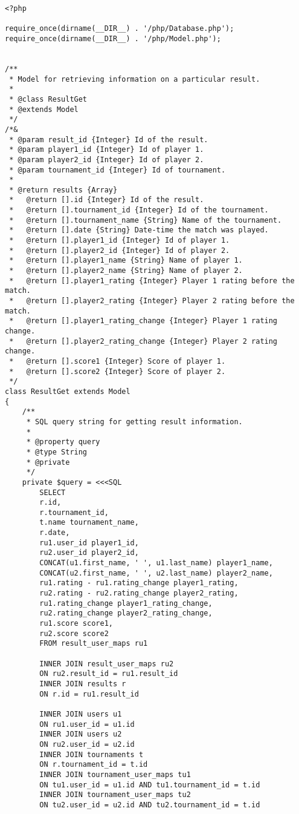 {\scriptsize
\begin{lstlisting}
<?php

require_once(dirname(__DIR__) . '/php/Database.php');
require_once(dirname(__DIR__) . '/php/Model.php');


/**
 * Model for retrieving information on a particular result.
 *
 * @class ResultGet
 * @extends Model
 */
/*&
 * @param result_id {Integer} Id of the result.
 * @param player1_id {Integer} Id of player 1.
 * @param player2_id {Integer} Id of player 2.
 * @param tournament_id {Integer} Id of tournament.
 *
 * @return results {Array}
 *   @return [].id {Integer} Id of the result.
 *   @return [].tournament_id {Integer} Id of the tournament.
 *   @return [].tournament_name {String} Name of the tournament.
 *   @return [].date {String} Date-time the match was played.
 *   @return [].player1_id {Integer} Id of player 1.
 *   @return [].player2_id {Integer} Id of player 2.
 *   @return [].player1_name {String} Name of player 1.
 *   @return [].player2_name {String} Name of player 2.
 *   @return [].player1_rating {Integer} Player 1 rating before the match.
 *   @return [].player2_rating {Integer} Player 2 rating before the match.
 *   @return [].player1_rating_change {Integer} Player 1 rating change.
 *   @return [].player2_rating_change {Integer} Player 2 rating change.
 *   @return [].score1 {Integer} Score of player 1.
 *   @return [].score2 {Integer} Score of player 2.
 */
class ResultGet extends Model
{
	/**
	 * SQL query string for getting result information.
	 *
	 * @property query
	 * @type String
	 * @private
	 */
	private $query = <<<SQL
		SELECT
		r.id,
		r.tournament_id,
		t.name tournament_name,
		r.date,
		ru1.user_id player1_id,
		ru2.user_id player2_id,
		CONCAT(u1.first_name, ' ', u1.last_name) player1_name,
		CONCAT(u2.first_name, ' ', u2.last_name) player2_name,
		ru1.rating - ru1.rating_change player1_rating,
		ru2.rating - ru2.rating_change player2_rating,
		ru1.rating_change player1_rating_change,
		ru2.rating_change player2_rating_change,
		ru1.score score1,
		ru2.score score2
		FROM result_user_maps ru1

		INNER JOIN result_user_maps ru2
		ON ru2.result_id = ru1.result_id
		INNER JOIN results r
		ON r.id = ru1.result_id
		
		INNER JOIN users u1
		ON ru1.user_id = u1.id
		INNER JOIN users u2
		ON ru2.user_id = u2.id
		INNER JOIN tournaments t
		ON r.tournament_id = t.id
		INNER JOIN tournament_user_maps tu1
		ON tu1.user_id = u1.id AND tu1.tournament_id = t.id
		INNER JOIN tournament_user_maps tu2
		ON tu2.user_id = u2.id AND tu2.tournament_id = t.id


\end{lstlisting}}
